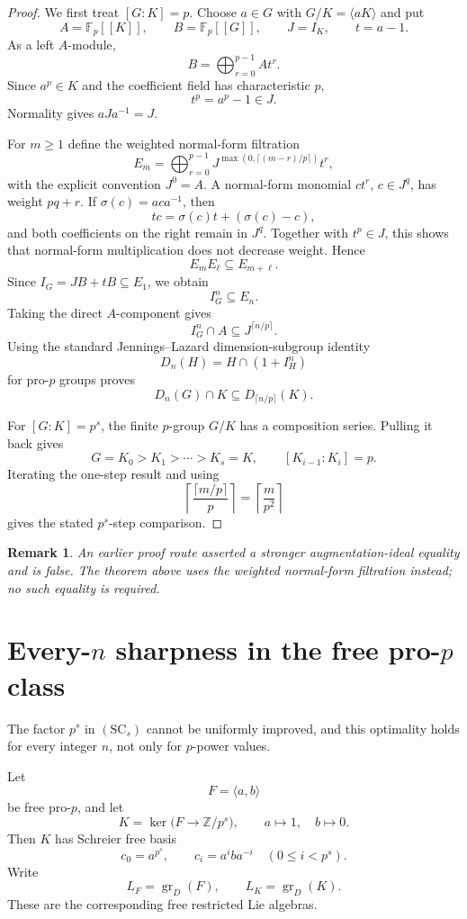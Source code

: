 \documentclass[11pt]{article}
\newtheorem{remark}[theorem]{Remark}
\begin{document}
\begin{proof}
We first treat $[G:K]=p$.  Choose $a\in G$ with $G/K=\langle aK\rangle$ and put
\[
A=\mathbb F_p[[K]],\qquad B=\mathbb F_p[[G]],\qquad
J=I_K,\qquad t=a-1.
\]
As a left $A$-module,
\[
B=\bigoplus_{r=0}^{p-1}At^r.
\]
Since $a^p\in K$ and the coefficient field has characteristic $p$,
\[
t^p=a^p-1\in J.
\]
Normality gives $aJa^{-1}=J$.

For $m\ge1$ define the weighted normal-form filtration
\[
E_m=
\bigoplus_{r=0}^{p-1}
J^{\max(0,\lceil(m-r)/p\rceil)}t^r,
\]
with the explicit convention $J^0=A$.  A normal-form monomial
$ct^r$, $c\in J^q$, has weight $pq+r$.  If
$\sigma(c)=aca^{-1}$, then
\[
tc=\sigma(c)t+(\sigma(c)-c),
\]
and both coefficients on the right remain in $J^q$.  Together with
$t^p\in J$, this shows that normal-form multiplication does not decrease
weight.  Hence
\[
E_mE_\ell\subseteq E_{m+\ell}.
\]
Since $I_G=JB+tB\subseteq E_1$, we obtain
\[
I_G^n\subseteq E_n.
\]
Taking the direct $A$-component gives
\[
I_G^n\cap A\subseteq J^{\lceil n/p\rceil}.
\]
Using the standard Jennings--Lazard dimension-subgroup identity
\[
D_n(H)=H\cap(1+I_H^n)
\]
for pro-$p$ groups \cite{DDMS1999} proves
\[
D_n(G)\cap K\subseteq D_{\lceil n/p\rceil}(K).
\]

For $[G:K]=p^s$, the finite $p$-group $G/K$ has a composition series.
Pulling it back gives
\[
G=K_0>K_1>\cdots>K_s=K,
\qquad [K_{i-1}:K_i]=p.
\]
Iterating the one-step result and using
\[
\left\lceil\frac{\lceil m/p\rceil}{p}\right\rceil
=
\left\lceil\frac m{p^2}\right\rceil
\]
gives the stated $p^s$-step comparison.
\end{proof}

\begin{remark}
An earlier proof route asserted a stronger augmentation-ideal equality
and is false.  The theorem above uses the weighted normal-form filtration
instead; no such equality is required.
\end{remark}

\section{Every-$n$ sharpness in the free pro-$p$ class}

The factor $p^s$ in $(\mathrm{SC}_s)$ cannot be uniformly improved, and this
optimality holds for every integer $n$, not only for $p$-power values.

Let
\[
F=\langle a,b\rangle
\]
be free pro-$p$, and let
\[
K=\ker\bigl(F\to\mathbb Z/p^s\bigr),
\qquad a\mapsto1,\quad b\mapsto0.
\]
Then $K$ has Schreier free basis
\[
c_0=a^{p^s},\qquad
c_i=a^iba^{-i}\quad(0\le i<p^s).
\]
Write
\[
L_F=\operatorname{gr}_D(F),\qquad
L_K=\operatorname{gr}_D(K).
\]
These are the corresponding free restricted Lie algebras.
\end{document}
